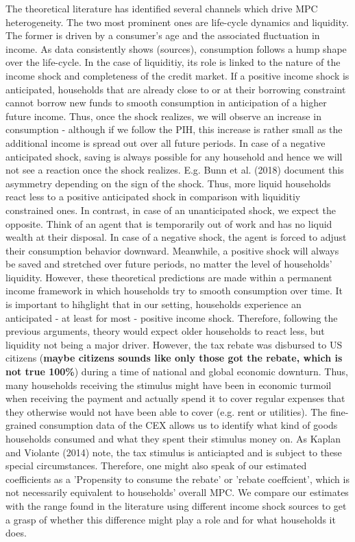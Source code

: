 The theoretical literature has identified several channels which drive MPC heterogeneity. The two most prominent ones are life-cycle dynamics and liquidity. The former is driven by a consumer's age and the associated fluctuation in income. As data consistently shows (sources), consumption follows a hump shape over the life-cycle. In the case of liquiditiy, its role is linked to the nature of the income shock and completeness of the credit market. If a positive income shock is anticipated, households that are already close to or at their borrowing constraint cannot borrow new funds to smooth consumption in anticipation of a higher future income. Thus, once the shock realizes, we will observe an increase in consumption - although if we follow the PIH, this increase is rather small as the additional income is spread out over all future periods. In case of a negative anticipated shock, saving is always possible for any household and hence we will not see a reaction once the shock realizes. E.g. Bunn et al. (2018) document this asymmetry depending on the sign of the shock. Thus, more liquid households react less to a positive anticipated shock in comparison with liquiditiy constrained ones. In contrast, in case of an unanticipated shock, we expect the opposite. Think of an agent that is temporarily out of work and has no liquid wealth at their disposal. In case of a negative shock, the agent is forced to adjust their consumption behavior downward. Meanwhile, a positive shock will always be saved and stretched over future periods, no matter the level of households' liquidity. However, these theoretical predictions are made within a permanent income framework in which households try to smooth consumption over time. It is important to hihglight that in our setting, households experience an anticipated - at least for most - positive income shock. Therefore, following the previous arguments, theory would expect older households to react less, but liquidity not being a major driver. However, the tax rebate was disbursed to US citizens (\textbf{maybe citizens sounds like only those got the rebate, which is not true 100\%}) during a time of national and global economic downturn. Thus, many households receiving the stimulus might have been in economic turmoil when receiving the payment and actually spend it to cover regular expenses that they otherwise would not have been able to cover (e.g. rent or utilities). The fine-grained consumption data of the CEX allows us to identify what kind of goods households consumed and what they spent their stimulus money on. As Kaplan and Violante (2014) note, the tax stimulus is anticiapted and is subject to these special circumstances. Therefore, one might also speak of our estimated coefficients as a 'Propensity to consume the rebate' or 'rebate coeffcient', which is not necessarily equivalent to households' overall MPC. We compare our estimates with the range found in the literature using different income shock sources to get a grasp of whether this difference might play a role and for what households it does. \\ 

